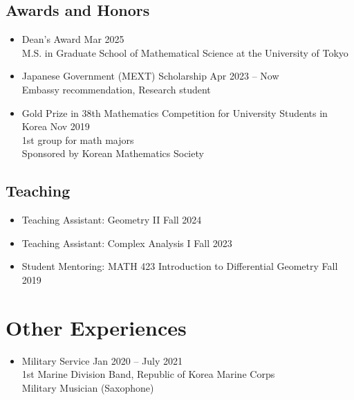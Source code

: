 \documentclass[11pt,a4paper]{article}
\begin{document}
\subsection*{Awards and Honors}
\begin{itemize}
\item
	Dean's Award
	\hfill{\small Mar 2025}\\
	M.S. in Graduate School of Mathematical Science at the University of Tokyo
\item
	Japanese Government (MEXT) Scholarship
	\hfill{\small Apr 2023 -- Now}\\
	Embassy recommendation, Research student
\item
	Gold Prize in 38th Mathematics Competition for University Students in Korea
	\hfill{\small Nov 2019}\\
	1st group for math majors\\
	Sponsored by Korean Mathematics Society
\end{itemize}


\subsection*{Teaching}

\begin{itemize}
\item
	Teaching Assistant: Geometry II
	\hfill{\small Fall 2024}
\item
	Teaching Assistant: Complex Analysis I
	\hfill{\small Fall 2023}
\item
	Student Mentoring: MATH 423 Introduction to Differential Geometry
	\hfill{\small Fall 2019}\\
\end{itemize}


\section*{Other Experiences}
\begin{itemize}
\item
	Military Service
	\hfill{\small Jan 2020 -- July 2021}\\
	1st Marine Division Band, Republic of Korea Marine Corps\\
	Military Musician (Saxophone)
\end{itemize}
\end{document}
